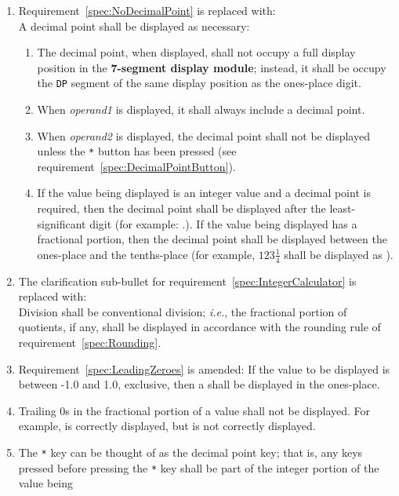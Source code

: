 \begin{enumerate}[resume]
\item Requirement~\ref{spec:NoDecimalPoint} is replaced with: \\
    A decimal point shall be displayed as necessary:
    \begin{enumerate}
    \item The decimal point, when displayed, shall not occupy a full display
        position in the \textbf{7-segment display module}; instead, it shall be
        occupy the \texttt{DP} segment of the same display position as the
        ones-place digit.
    \item When \textit{operand1} is displayed, it shall always include a
        decimal point.
    \item When \textit{operand2} is displayed, the decimal point shall not be
        displayed unless the \texttt{*} button has been pressed (see
        requirement~\ref{spec:DecimalPointButton}).
    \item If the value being displayed is an integer value and a decimal point
        is required, then the decimal point shall be displayed after the
        least-significant digit (for example: {.}). If the value
        being displayed has a fractional portion, then the decimal point shall
        be displayed between the ones-place and the tenths-place (for example,
        $123\frac{1}{4}$ shall be displayed as {}).
    \end{enumerate}
\item The clarification sub-bullet for requirement~\ref{spec:IntegerCalculator}
    is replaced with: \\
    Division shall be conventional division; \textit{i.e.}, the fractional
    portion of quotients, if any, shall be displayed in accordance with the
    rounding rule of requirement~\ref{spec:Rounding}.
\item Requirement~\ref{spec:LeadingZeroes} is amended: If the value to be
    displayed is between -1.0 and 1.0, exclusive, then a {} shall be
    displayed in the ones-place.
\item Trailing 0s in the fractional portion of a value shall not be displayed.
    For example, {} is correctly displayed, but {} is not correctly displayed.
\item \label{spec:DecimalPointButton} The \texttt{*} key can be thought of
    as the decimal point key; that is, any keys pressed before pressing the
    \texttt{*} key shall be part of the integer portion of the value being

\end{enumerate}
